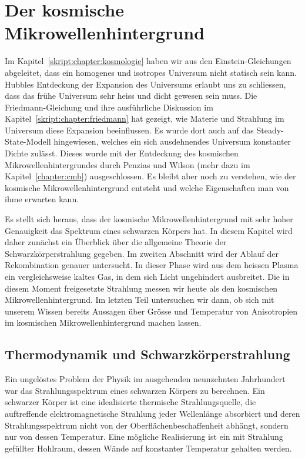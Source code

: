%
%
%
\chapter{Der kosmische Mikrowellenhintergrund%
\label{skript:chapter:cmb}}
\rhead{}
Im Kapitel~\ref{skript:chapter:kosmologie} haben wir aus den
Einstein-Gleichungen abgeleitet, dass ein homogenes und isotropes
Universum nicht statisch sein kann.
Hubbles Entdeckung der Expansion des Universums erlaubt uns zu
schliessen, dass das frühe Universum sehr heiss und dicht gewesen
sein muss.
Die Friedmann-Gleichung und ihre ausführliche Diskussion im
Kapitel~\ref{skript:chapter:friedmann} hat gezeigt, wie Materie und
Strahlung im Universum diese Expansion beeinflussen.
Es wurde dort auch auf das Steady-State-Modell hingewiesen, welches
ein sich ausdehnendes Universum konstanter Dichte zulässt.
Dieses wurde mit der Entdeckung des kosmischen Mikrowellenhintergrundes durch
Penzias und Wilson (mehr dazu im Kapitel~\ref{chapter:cmb}) ausgeschlossen.
Es bleibt aber noch zu verstehen, wie der kosmische Mikrowellenhintergrund
entsteht und welche Eigenschaften man von ihme erwarten kann.

Es stellt sich heraus, dass der kosmische Mikrowellenhintergrund mit sehr
hoher Genauigkeit das Spektrum eines schwarzen Körpers hat.
In diesem Kapitel wird daher zunächst ein Überblick über die allgemeine
Theorie der Schwarzkörperstrahlung gegeben.
Im zweiten Abschnitt wird der Ablauf der Rekombination genauer untersucht.
In dieser Phase wird aus dem heissen Plasma ein vergleichsweise kaltes Gas,
in dem sich Licht ungehindert ausbreitet.
Die in diesem Moment freigesetzte Strahlung messen wir heute als den
kosmischen Mikrowellenhintergrund.
Im letzten Teil untersuchen wir dann, ob sich mit unserem Wissen
bereits Aussagen über Grösse und Temperatur von Anisotropien im kosmischen
Mikrowellenhintergrund machen lassen.

\section{Thermodynamik und Schwarzkörperstrahlung}
Ein ungelöstes Problem der Physik im ausgehenden neunzehnten Jahrhundert
war das Strahlungsspektrum eines schwarzen Körpers zu berechnen.
Ein schwarzer Körper ist eine idealisierte thermische Strahlungsquelle,
die auftreffende elektromagnetische Strahlung jeder Wellenlänge absorbiert
und deren Strahlungsspektrum nicht von der Oberflächenbeschaffenheit
abhängt, sondern nur von dessen Temperatur.
Eine mögliche Realisierung ist ein mit Strahlung gefüllter Hohlraum, dessen
Wände auf konstanter Temperatur gehalten werden.

